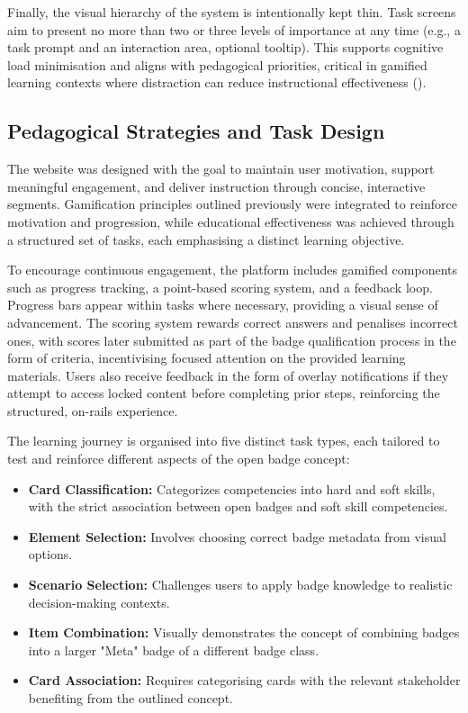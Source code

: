 Finally, the visual hierarchy of the system is intentionally kept thin. 
Task screens aim to present no more than two or three levels of importance at any time (e.g., a task prompt and an interaction area, optional tooltip). 
This supports cognitive load minimisation and aligns with pedagogical priorities, critical in gamified learning contexts where distraction can reduce instructional effectiveness (\cite{reduceDistraction}).

\subsection{Pedagogical Strategies and Task Design}
The website was designed with the goal to maintain user motivation, support meaningful engagement, and deliver instruction through concise, interactive segments. 
Gamification principles outlined previously were integrated to reinforce motivation and progression, while educational effectiveness was achieved through a structured set of tasks, each emphasising a distinct learning objective.

To encourage continuous engagement, the platform includes gamified components such as progress tracking, a point-based scoring system, and a feedback loop. 
Progress bars appear within tasks where necessary, providing a visual sense of advancement. 
The scoring system rewards correct answers and penalises incorrect ones, with scores later submitted as part of the badge qualification process in the form of criteria, incentivising focused attention on the provided learning materials. 
Users also receive feedback in the form of overlay notifications if they attempt to access locked content before completing prior steps, reinforcing the structured, on-rails experience.

The learning journey is organised into five distinct task types, each tailored to test and reinforce different aspects of the open badge concept:
\begin{itemize}
    \item \textbf{Card Classification:} Categorizes competencies into hard and soft skills, with the strict association between open badges and soft skill competencies.
    \item \textbf{Element Selection:} Involves choosing correct badge metadata from visual options.
    \item \textbf{Scenario Selection:} Challenges users to apply badge knowledge to realistic decision-making contexts.
    \item \textbf{Item Combination:} Visually demonstrates the concept of combining badges into a larger "Meta" badge of a different badge class.
    \item \textbf{Card Association:} Requires categorising cards with the relevant stakeholder benefiting from the outlined concept.
\end{itemize}

